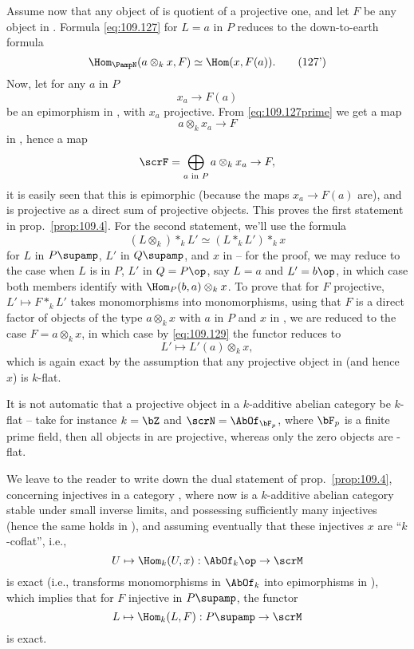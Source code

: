 Assume now that any object of \scrN{} is quotient of a projective
one, and let $F$ be any object in \PampN. Formula \eqref{eq:109.127}
for $L=a$ in $P$ reduces to the down-to-earth formula
\begin{equation}
  \label{eq:109.127prime}
  \Hom_\PampN(a\otimes_kx,F)\simeq\Hom(x,F(a)).\tag{127'}
\end{equation}
Now, let for any $a$ in $P$
\[x_a\to F(a)\]
be an epimorphism in \scrN, with $x_a$ projective. From
\eqref{eq:109.127prime} we get a map
\[a\otimes_kx_a\to F\]
in \PampN, hence a map
\[\scrF = \bigoplus_{\text{$a$ in $P$}} a\otimes_kx_a \to F,\]
it is easily seen that this is epimorphic (because the maps $x_a\to
F(a)$ are), and \scrF{} is projective as a direct sum of projective
objects. This proves the first statement in prop.\
\ref{prop:109.4}. For the second statement, we'll use the formula
\begin{equation}
  \label{eq:109.129}
  (L\otimes_k) *_k L' \simeq (L *_k L') *_k x\tag{129}
\end{equation}
for $L$ in $P\supamp$, $L'$ in $Q\supamp$, and $x$ in \scrN{} -- for
the proof, we may reduce to the case when $L$ is in $P$, $L'$ in
$Q=P\op$, say $L=a$ and $L'=b\op$, in which case both members identify
with $\Hom_P(b,a)\otimes_k x$. To prove that for $F$ projective,
$L'\mapsto F*_kL'$ takes monomorphisms into monomorphisms, using that
$F$ is a direct factor of objects of the type $a\otimes_k x$ with $a$
in $P$ and $x$ in \scrN, we are reduced to the case $F=a\otimes_kx$,
in which case by \eqref{eq:109.129} the functor reduces to
\[L'\mapsto L'(a)\otimes_kx,\]
which is again exact by the assumption that any projective object in
\scrN{} (and hence $x$) is $k$-flat.
\begin{remark}
  It is not automatic that a projective object in a $k$-additive
  abelian category be $k$-flat -- take for instance $k=\bZ$ and
  $\scrN=\AbOf_{\bF_p}$, where $\bF_p$ is a finite prime field, then
  all objects in \scrN{} are projective, whereas only the zero objects
  are \bZ-flat.
\end{remark}

We leave to the reader to write down the dual statement of prop.\
\ref{prop:109.4}, concerning injectives in a category \PampM, where
now \scrM{} is a $k$-additive abelian category stable under small
inverse limits, and possessing sufficiently many injectives (hence the
same holds in \PampM), and assuming eventually that these injectives $x$
are ``$k$-coflat'', i.e.,
\[U\mapsto\Hom_k(U,x) : \AbOf_k\op\to\scrM\]
is exact (i.e., transforms monomorphisms in $\AbOf_k$ into
epimorphisms in\pspage{436} \scrM), which implies that for $F$
injective in $P\supamp$, the functor
\[L\mapsto\Hom_k(L,F) : P\supamp\to\scrM\]
is exact.

